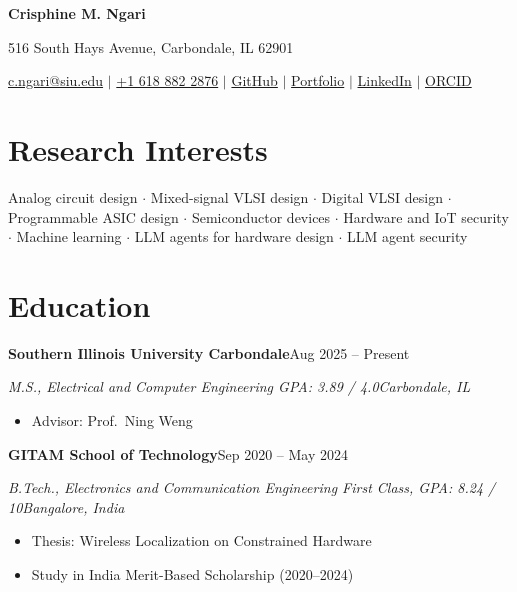 \documentclass[10.5pt,letterpaper]{article}
\newcommand{\entry}[2]{\textbf{#1}\hfill #2\par}
\newcommand{\subentry}[2]{\textit{#1}\hfill \textit{#2}\par\vspace{0.15em}}
\begin{document}
\begin{center}
  {\LARGE\bfseries Crisphine M. Ngari}\par
  \vspace{0.15em}
  516 South Hays Avenue, Carbondale, IL 62901\par
  \vspace{0.12em}
  \href{mailto:c.ngari@siu.edu}{c.ngari@siu.edu}
  \enspace$\mid$\enspace
  \href{tel:+16188822876}{+1 618 882 2876}
  \enspace$\mid$\enspace
  \href{https://github.com/crisphinen}{GitHub}
  \enspace$\mid$\enspace
  \href{https://crisphinen.github.io/}{Portfolio}
  \enspace$\mid$\enspace
  \href{https://www.linkedin.com/in/crisphine-ngari-a73016204/}{LinkedIn}
  \enspace$\mid$\enspace
  \href{https://orcid.org/0009-0005-7834-5521}{ORCID}
\end{center}
\vspace{-0.7em}

\section*{Research Interests}
Analog circuit design $\cdot$ Mixed-signal VLSI design $\cdot$ Digital VLSI design $\cdot$
Programmable ASIC design $\cdot$ Semiconductor devices $\cdot$ Hardware and IoT security $\cdot$
Machine learning $\cdot$ LLM agents for hardware design $\cdot$ LLM agent security

\section*{Education}
\entry{Southern Illinois University Carbondale}{Aug 2025 -- Present}
\subentry{M.S., Electrical and Computer Engineering \quad GPA: 3.89 / 4.0}{Carbondale, IL}
\begin{itemize}
  \item Advisor: Prof.\ Ning Weng
\end{itemize}
\vspace{0.35em}
\entry{GITAM School of Technology}{Sep 2020 -- May 2024}
\subentry{B.Tech., Electronics and Communication Engineering \quad First Class, GPA: 8.24 / 10}{Bangalore, India}
\begin{itemize}
  \item Thesis: Wireless Localization on Constrained Hardware
  \item Study in India Merit-Based Scholarship (2020--2024)
\end{itemize}
\end{document}
